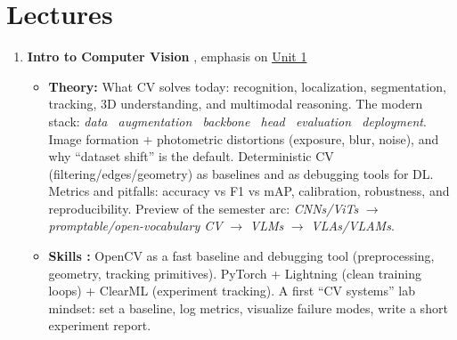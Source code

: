 \documentclass[a4paper,11pt]{texMemo}
\begin{document}
\maketitle

\section{Lectures}
\begin{enumerate}

\item \textbf{Intro to Computer Vision}
\citep{HuggingFaceCVcourse,szeliski2022computer, merkulov2022optimSeminars, prince2023understanding,CVcourseCSCI1430,gitCV-2026, LightningColab}, 
emphasis on \href{https://huggingface.co/learn/computer-vision-course/en/unit1/chapter1/motivation}{Unit 1} \citep{HuggingFaceCVcourse} 
\begin{itemize}
    \item \textbf{Theory:}
    What CV solves today: recognition, localization, segmentation, tracking, 3D understanding, and multimodal reasoning.
    The modern stack: \emph{data \textrightarrow\ augmentation \textrightarrow\ backbone \textrightarrow\ head \textrightarrow\ evaluation \textrightarrow\ deployment}.
    Image formation + photometric distortions (exposure, blur, noise), and why ``dataset shift'' is the default.
    Deterministic CV (filtering/edges/geometry) as baselines and as debugging tools for DL.
    Metrics and pitfalls: accuracy vs F1 vs mAP, calibration, robustness, and reproducibility.
    Preview of the semester arc: \emph{CNNs/ViTs} $\rightarrow$ \emph{promptable/open-vocabulary CV} $\rightarrow$ \emph{VLMs} $\rightarrow$ \emph{VLAs/VLAMs}.
    \item \textbf{Skills :}
    OpenCV as a fast baseline and debugging tool (preprocessing, geometry, tracking primitives).
    PyTorch + Lightning (clean training loops) + ClearML (experiment tracking).
    A first ``CV systems'' lab mindset: set a baseline, log metrics, visualize failure modes, write a short experiment report.
\end{itemize}


\end{enumerate}
\end{document}
